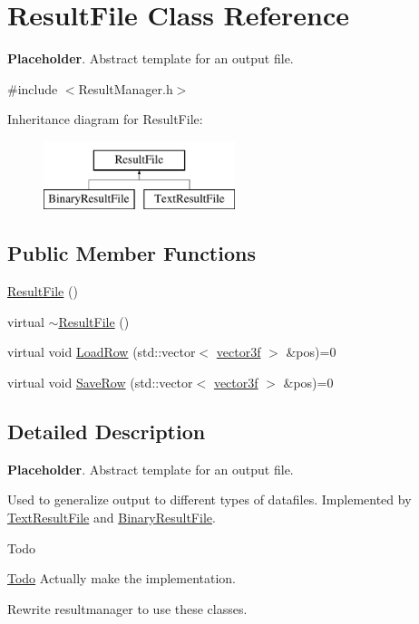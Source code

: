 \hypertarget{class_result_file}{}\section{Result\+File Class Reference}
\label{class_result_file}


{\bfseries Placeholder}. Abstract template for an output file.  




{\ttfamily \#include $<$Result\+Manager.\+h$>$}

Inheritance diagram for Result\+File\+:\begin{figure}[H]
\begin{center}
\leavevmode
\includegraphics[height=2.000000cm]{class_result_file}
\end{center}
\end{figure}
\subsection*{Public Member Functions}
\begin{DoxyCompactItemize}
\item 
\hyperlink{class_result_file_acb7a37621dfa56260e20d6742a74e616}{Result\+File} ()
\item 
virtual \hyperlink{class_result_file_afc2e88e562796e605707e12f2cc1b9fd}{$\sim$\+Result\+File} ()
\item 
virtual void \hyperlink{class_result_file_aeeb1227765bbf018ffe648b14c8b606e}{Load\+Row} (std\+::vector$<$ \hyperlink{std__incl_8h_a2feaef1d85a74bd5cf80df91b1a9a914}{vector3f} $>$ \&pos)=0
\item 
virtual void \hyperlink{class_result_file_ab9f7315f014b72d11c80f28e41f4671c}{Save\+Row} (std\+::vector$<$ \hyperlink{std__incl_8h_a2feaef1d85a74bd5cf80df91b1a9a914}{vector3f} $>$ \&pos)=0
\end{DoxyCompactItemize}


\subsection{Detailed Description}
{\bfseries Placeholder}. Abstract template for an output file. 

Used to generalize output to different types of datafiles. Implemented by \hyperlink{class_text_result_file}{Text\+Result\+File} and \hyperlink{class_binary_result_file}{Binary\+Result\+File}. \begin{DoxyRefDesc}{Todo}
\item[\hyperlink{todo__todo000003}{Todo}]Actually make the implementation. 

Rewrite resultmanager to use these classes. \end{DoxyRefDesc}


